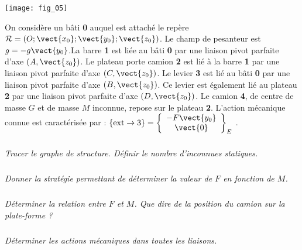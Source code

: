 \setcounter{exo}{0}


\begin{center}
\texttt{[image: fig\_05]}
\end{center}

\setcounter{exo}{0}
On considère un bâti \textbf{0} auquel est attaché le repère$\mathcal{R}=\left(O;\vect{x_0};\vect{y_0};\vect{z_0} \right)$. Le champ de pesanteur est $g=-g\vect{y_0}$.La barre \textbf{1} est liée au bâti \textbf{0} par une liaison pivot parfaite d’axe $\left(A,\vect{z_0}\right)$. Le plateau porte camion \textbf{2} est lié à la barre \textbf{1} par une liaison pivot parfaite d’axe $\left(C,\vect{z_0}\right)$. Le levier \textbf{3} est lié au bâti \textbf{0} par une liaison pivot parfaite d’axe $\left(B,\vect{z_0}\right)$. Ce levier est également lié au plateau \textbf{2} par une liaison pivot parfaite d’axe $\left(D,\vect{z_0}\right)$. Le camion \textbf{4}, de centre de masse $G$ et de masse $M$ inconnue, repose sur le plateau \textbf{2}.
L’action mécanique connue est caractérisée par : $\{\text{ext}\rightarrow 3\}=\left\{
\begin{array}{c}
-F\vect{y_0} \\
\vect{0} \\
\end{array}
\right\}_E$ .




\subparagraph{}\textit{Tracer le graphe de structure. Définir le nombre d'inconnues statiques.}

\subparagraph{}\textit{Donner la stratégie permettant de déterminer la valeur de $F$ en fonction de $M$.}

\subparagraph{}\textit{Déterminer la relation entre $F$ et $M$. Que dire de la position du camion sur la plate-forme ?}

\subparagraph{}\textit{Déterminer les actions mécaniques dans toutes les liaisons.}
